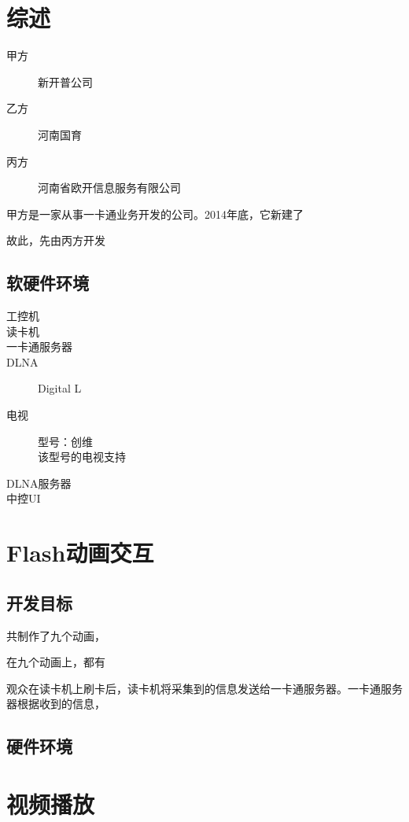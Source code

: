 \chapter{综述}
\begin{description}
\item[甲方] 新开普公司 %
\item[乙方] 河南国育
\item[丙方] 河南省欧开信息服务有限公司
\end{description}
甲方是一家从事一卡通业务开发的公司。2014年底，它新建了

故此，先由丙方开发

\section{软硬件环境}
\begin{description}
\item[工控机] 
\item[读卡机]
\item[一卡通服务器] 
\item[DLNA] Digital L 
\item[电视] 型号：创维\\
该型号的电视支持
\item[DLNA服务器]
\item[中控UI] 
\end{description}
\section{}

\chapter{Flash动画交互}


\section{开发目标}
共制作了九个动画，

在九个动画上，都有

观众在读卡机上刷卡后，读卡机将采集到的信息发送给一卡通服务器。一卡通服务器根据收到的信息，

\section{硬件环境}

\chapter{视频播放}

